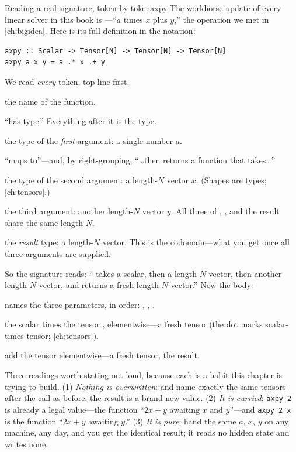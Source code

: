 \begin{workedexample}{Reading a real signature, token by token}{axpy}
The workhorse update of every linear solver in this book is ---``$a$
times $x$ plus $y$,'' the operation we met in \cref{ch:bigidea}. Here is its
full definition in the notation:
\begin{lstlisting}[style=l4style]
axpy :: Scalar -> Tensor[N] -> Tensor[N] -> Tensor[N]
axpy a x y = a .* x .+ y
\end{lstlisting}
We read \emph{every} token, top line first.
\begin{description}[style=nextline,leftmargin=1.4em,nosep]
  \item[\code{axpy}] the name of the function.
  \item[\code{::}] ``has type.'' Everything after it is the type.
  \item[\code{Scalar}] the type of the \emph{first} argument: a single number $a$.
  \item[the first \code{->}] ``maps to''---and, by right-grouping, ``\dots then
  returns a function that takes\dots''
  \item[\code{Tensor[N]} (second)] the type of the second argument: a length-$N$
  vector $x$. (Shapes are types; \cref{ch:tensors}.)
  \item[\code{Tensor[N]} (third)] the third argument: another length-$N$ vector
  $y$. All three of , , and the result share the same length $N$.
  \item[\code{Tensor[N]} (last)] the \emph{result} type: a length-$N$ vector. This
  is the codomain---what you get once all three arguments are supplied.
\end{description}
So the signature reads: `` takes a scalar, then a length-$N$ vector,
then another length-$N$ vector, and returns a fresh length-$N$ vector.'' Now the
body:
\begin{description}[style=nextline,leftmargin=1.4em,nosep]
  \item[\code{axpy a x y}] names the three parameters, in order: , ,
  .
  \item[\code{a .* x}] the scalar  times the tensor
  , elementwise---a fresh tensor (the  dot marks
  scalar-times-tensor; \cref{ch:tensors}).
  \item[\code{.+ y}] add the tensor  elementwise---a
  fresh tensor, the result.
\end{description}
Three readings worth stating out loud, because each is a habit this chapter is
trying to build. (1) \emph{Nothing is overwritten}:  and  name
exactly the same tensors after the call as before; the result is a brand-new
value. (2) \emph{It is curried}: \lstinline[style=l4style]|axpy 2| is already a
legal value---the function ``$2x + y$ awaiting $x$ and $y$''---and
\lstinline[style=l4style]|axpy 2 x| is the function ``$2x + y$ awaiting $y$.''
(3) \emph{It is pure}: hand  the same $a$, $x$, $y$ on any machine, any
day, and you get the identical result; it reads no hidden state and writes none.
\end{workedexample}

